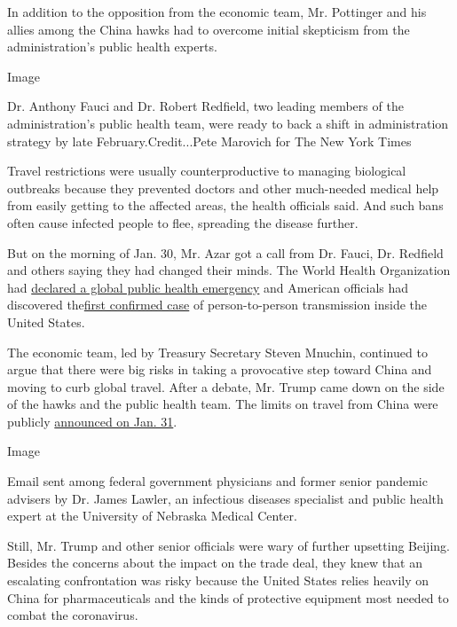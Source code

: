 In addition to the opposition from the economic team, Mr. Pottinger and
his allies among the China hawks had to overcome initial skepticism from
the administration's public health experts.

Image

Dr. Anthony Fauci and Dr. Robert Redfield, two leading members of the
administration's public health team, were ready to back a shift in
administration strategy by late February.Credit...Pete Marovich for The
New York Times

Travel restrictions were usually counterproductive to managing
biological outbreaks because they prevented doctors and other
much-needed medical help from easily getting to the affected areas, the
health officials said. And such bans often cause infected people to
flee, spreading the disease further.

But on the morning of Jan. 30, Mr. Azar got a call from Dr. Fauci, Dr.
Redfield and others saying they had changed their minds. The World
Health Organization had
\href{https://www.who.int/news-room/detail/30-01-2020-statement-on-the-second-meeting-of-the-international-health-regulations-(2005)-emergency-committee-regarding-the-outbreak-of-novel-coronavirus-(2019-ncov)}{declared
a global public health emergency} and American officials had discovered
the\href{https://www.cdc.gov/media/releases/2020/p0130-coronavirus-spread.html}{first
confirmed case} of person-to-person transmission inside the United
States.

The economic team, led by Treasury Secretary Steven Mnuchin, continued
to argue that there were big risks in taking a provocative step toward
China and moving to curb global travel. After a debate, Mr. Trump came
down on the side of the hawks and the public health team. The limits on
travel from China were publicly
\href{https://www.whitehouse.gov/presidential-actions/proclamation-suspension-entry-immigrants-nonimmigrants-persons-pose-risk-transmitting-2019-novel-coronavirus/}{announced
on Jan. 31}.

Image

Email sent among federal government physicians and former senior
pandemic advisers by Dr. James Lawler, an infectious diseases specialist
and public health expert at the University of Nebraska Medical Center.

Still, Mr. Trump and other senior officials were wary of further
upsetting Beijing. Besides the concerns about the impact on the trade
deal, they knew that an escalating confrontation was risky because the
United States relies heavily on China for pharmaceuticals and the kinds
of protective equipment most needed to combat the coronavirus.


